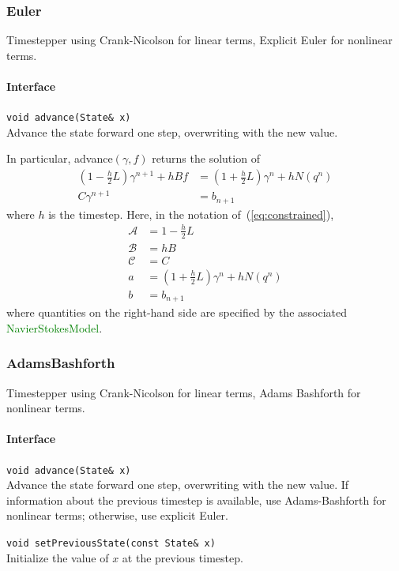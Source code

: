 \documentclass[11pt]{article}
\def\class#1{\textcolor{green}{\ttfamily\small #1}} %
\def\fn#1{{\ttfamily\small #1}} %
\let\code\lstinline
\begin{document}
\subsubsection{Euler}
Timestepper using Crank-Nicolson for linear terms, Explicit Euler for nonlinear terms.

\paragraph{Interface}
\begin{description}
	\item \code|void advance(State& x)|\\
		Advance the state forward one step, overwriting with the new value.  
\end{description}

In particular, \fn{advance}$(\gamma,f)$ returns the solution of
	\begin{align}
		(1-\frac{h}{2}L)\gamma^{n+1} + hBf &= (1 + \frac{h}{2}L)\gamma^n + h N(q^n)\\
		C\gamma^{n+1} &= b_{n+1}
	\end{align}
where $h$ is the timestep.  Here, in the notation of~(\ref{eq:constrained}),
\begin{align}
	\mathcal{A} &= 1-\frac{h}{2} L\\
	\mathcal{B} &= hB\\
	\mathcal{C} &= C\\
	a &= (1+\frac{h}{2}L)\gamma^n + hN(q^n)\\
	b &= b_{n+1}
\end{align}
where quantities on the right-hand side are specified by the associated \class{NavierStokesModel}.

\subsubsection{AdamsBashforth}
Timestepper using Crank-Nicolson for linear terms, Adams Bashforth for nonlinear terms.

\paragraph{Interface}
\begin{description}
	\item \code|void advance(State& x)|\\
		Advance the state forward one step, overwriting with the new value.  If information about the previous timestep is available, use Adams-Bashforth for nonlinear terms; otherwise, use explicit Euler.
	\item \code|void setPreviousState(const State& x)|\\
		Initialize the value of $x$ at the previous timestep.
\end{description}
\end{document}
